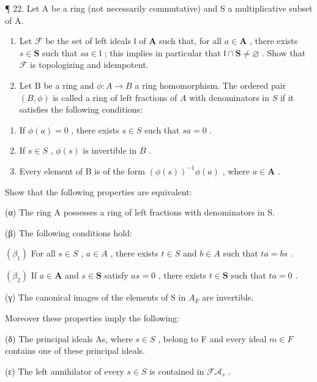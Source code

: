 ¶ 22. Let A be a ring (not necessarily commutative) and S a multiplicative subset of A.

\begin{enumerate}
\def\labelenumi{(\alph{enumi})}
\item
  Let \(\mathcal{F}\) be the set of left ideals \(\mathfrak{l}\) of \(\mathbf{A}\) such that, for all \(a\in \mathbf{A}\) , there exists \(s\in \mathbf{S}\) such that \(sa\in \mathfrak{l}\) ; this implies in particular that \(\mathfrak{l}\cap \mathbf{S}\neq \varnothing\) . Show that \(\mathcal{F}\) is topologizing and idempotent.
\item
  Let B be a ring and \(\phi: A \to B\) a ring homomorphism. The ordered pair \((B, \phi)\) is called a ring of left fractions of \(A\) with denominators in \(S\) if it satisfies the following conditions:
\end{enumerate}

\begin{enumerate}
\def\labelenumi{(\Roman{enumi})}
\item
  If \(\phi(a) = 0\) , there exists \(s \in S\) such that \(sa = 0\) .
\item
  If \(s \in S\) , \(\phi(s)\) is invertible in \(B\) .
\item
  Every element of B is of the form \((\phi(s))^{-1}\phi(a)\) , where \(a \in \mathbf{A}\) .
\end{enumerate}

Show that the following properties are equivalent:

(α) The ring A possesses a ring of left fractions with denominators in S.

(β) The following conditions hold:

\((\beta_{1})\) For all \(s \in S\) , \(a \in A\) , there exists \(t \in S\) and \(b \in A\) such that \(ta = bs\) .

\((\beta_{2})\) If \(a \in \mathbf{A}\) and \(s \in \mathbf{S}\) satisfy \(as = 0\) , there exists \(t \in \mathbf{S}\) such that \(ta = 0\) .

(γ) The canonical images of the elements of S in \(A_{F}\) are invertible.

Moreover these properties imply the following:

(δ) The principal ideals As, where \(s \in S\) , belong to F and every ideal \(m \in F\) contains one of these principal ideals.

(ε) The left annihilator of every \(s \in S\) is contained in \(\mathcal{FA}_{s}\) .


